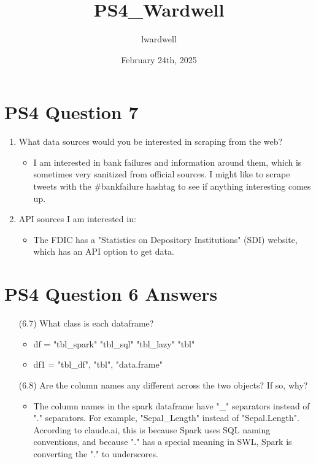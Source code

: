 \documentclass{article}
\title{PS4\_Wardwell}
\author{lwardwell }
\date{February 24th, 2025}
\begin{document}
\maketitle

\section*{PS4 Question 7}
\begin{enumerate}
    \item What data sources would you be interested in scraping from the web?
    \begin{itemize}
        \item I am interested in bank failures and information around them, which is sometimes very sanitized from official sources. I might like to scrape tweets with the \#bankfailure hashtag to see if anything interesting comes up.  
    \end{itemize}
    \item API sources I am interested in:
    \begin{itemize}
        \item The FDIC has a "Statistics on Depository Institutions" (SDI) website, which has an API option to get data. 
    \end{itemize}
    \end{enumerate}
\section*{PS4 Question 6 Answers}
\begin{enumerate}
        \item [(6.7)] What class is each dataframe?
        \begin{itemize}
            \item df = "tbl\_spark" "tbl\_sql"   "tbl\_lazy"  "tbl"
            \item df1 = "tbl\_df", "tbl", "data.frame"
    \end{itemize}
        \item [(6.8)] Are the column names any different across the two objects? If so, why?
        \begin{itemize}
            \item The column names in the spark dataframe have "\_" separators instead of "." separators. For example, "Sepal\_Length" instead of "Sepal.Length". According to claude.ai, this is because Spark uses SQL naming conventions, and because "." has a special meaning in SWL, Spark is converting the "." to underscores.
    \end{itemize}


    
\end{enumerate}
\end{document}
